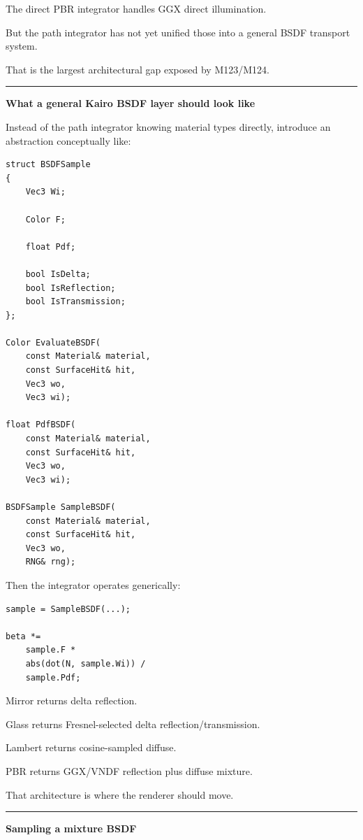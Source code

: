 The direct PBR integrator handles GGX direct illumination.

But the path integrator has not yet unified those into a general BSDF transport system.

That is the largest architectural gap exposed by M123/M124.

\begin{center}\rule{0.5\linewidth}{0.5pt}\end{center}

\textbf{What a general Kairo BSDF layer should look like}

Instead of the path integrator knowing material types directly, introduce an abstraction conceptually like:

\begin{verbatim}
struct BSDFSample
{
    Vec3 Wi;

    Color F;

    float Pdf;

    bool IsDelta;
    bool IsReflection;
    bool IsTransmission;
};

Color EvaluateBSDF(
    const Material& material,
    const SurfaceHit& hit,
    Vec3 wo,
    Vec3 wi);

float PdfBSDF(
    const Material& material,
    const SurfaceHit& hit,
    Vec3 wo,
    Vec3 wi);

BSDFSample SampleBSDF(
    const Material& material,
    const SurfaceHit& hit,
    Vec3 wo,
    RNG& rng);
\end{verbatim}

Then the integrator operates generically:

\begin{verbatim}
sample = SampleBSDF(...);

beta *=
    sample.F *
    abs(dot(N, sample.Wi)) /
    sample.Pdf;
\end{verbatim}

Mirror returns delta reflection.

Glass returns Fresnel-selected delta reflection/transmission.

Lambert returns cosine-sampled diffuse.

PBR returns GGX/VNDF reflection plus diffuse mixture.

That architecture is where the renderer should move.

\begin{center}\rule{0.5\linewidth}{0.5pt}\end{center}

\textbf{Sampling a mixture BSDF}

